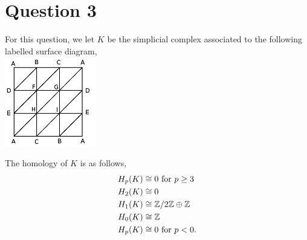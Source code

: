 \documentclass{unswmaths}
\begin{document}
\section*{Question 3}
For this question, we let $K$ be the simplicial complex associated
to the following labelled surface diagram,\\
\includegraphics[width=40mm]{klein.png}\\
\begin{proposition}
    The homology of $K$ is as follows,
    \begin{align*}
        H_p(K) &\cong 0\text{ for }p \geq 3\\
        H_2(K) &\cong 0\\
        H_1(K) &\cong  \mathbb{Z}/2\mathbb{Z} \oplus \mathbb{Z}\\
        H_0(K) &\cong \mathbb{Z}\\
        H_p(K) &\cong 0\text{ for }p < 0.
    \end{align*}
\end{proposition}
\end{document}
